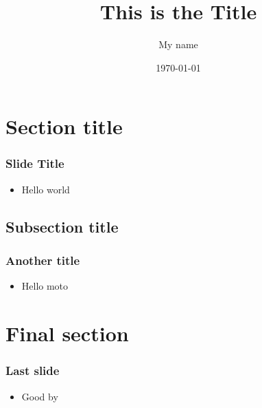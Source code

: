 \documentclass{beamer}
\title{This is the Title}
\author{My name}
\date{\today}
\begin{document}
\begin{frame}
\maketitle
\end{frame}
\section{Section title}
\begin{frame}
\frametitle{Slide Title}
\begin{itemize}
\item Hello world
\end{itemize}
\end{frame}
\subsection{Subsection title}
\begin{frame}
\frametitle{Another title}
\begin{itemize}
\item Hello moto
\end{itemize}
\end{frame}
\section{Final section}
\begin{frame}
\frametitle{Last slide}
\begin{itemize}
\item Good by
\end{itemize}
\end{frame}
\end{document}
